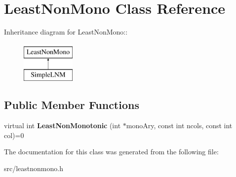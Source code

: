 \hypertarget{classLeastNonMono}{
\section{LeastNonMono Class Reference}
\label{d9/da9/classLeastNonMono}
}
Inheritance diagram for LeastNonMono::\begin{figure}[H]
\begin{center}
\leavevmode
\includegraphics[height=2cm]{d9/da9/classLeastNonMono}
\end{center}
\end{figure}
\subsection*{Public Member Functions}
\begin{DoxyCompactItemize}
\item 
\hypertarget{classLeastNonMono_a239cbd7836950dc7c758138c4db00d0c}{
virtual int {\bfseries LeastNonMonotonic} (int $\ast$monoAry, const int ncols, const int col)=0}
\label{d9/da9/classLeastNonMono_a239cbd7836950dc7c758138c4db00d0c}

\end{DoxyCompactItemize}


The documentation for this class was generated from the following file:\begin{DoxyCompactItemize}
\item 
src/leastnonmono.h\end{DoxyCompactItemize}
